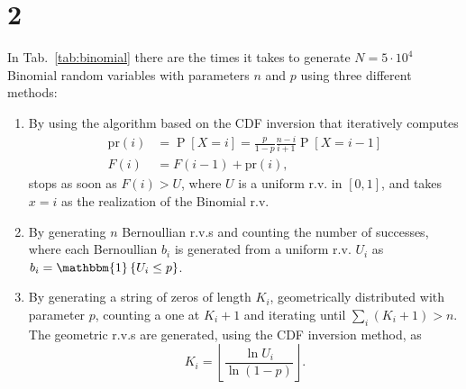\documentclass[a4paper,oneside]{article}
\newcommand{\floor}[1]{\left\lfloor#1\right\rfloor}
\newcommand{\Prob}[1]{\operatorname{P}\left[#1\right]}
\newcommand{\ind}[1]{\operatorname{\mathbbm{1}}\left\{#1\right\}}
\begin{document}
\section*{2}
In Tab.~\ref{tab:binomial} there are the times it takes to generate
$N=5\cdot10^4$ Binomial random variables with parameters $n$ and $p$
using three different methods:
\begin{enumerate}
\item By using the algorithm based on the CDF inversion that
  iteratively computes
  \begin{align*}
    \mathrm{pr}(i) &= \Prob{X = i} = \frac{p}{1-p}\frac{n-i}{i+1}\Prob{X = i-1} \\
    F(i) &= F(i-1) + \mathrm{pr}(i) ,
  \end{align*}
  stops as soon as $F(i) > U$, where $U$ is a uniform r.v. in $[0,
    1]$, and takes $x = i$ as the realization of the Binomial r.v.
  \item By generating $n$ Bernoullian r.v.s and counting the number of
    successes, where each Bernoullian $b_i$ is generated from a uniform
    r.v. $U_i$ as $b_i = \ind{U_i \leq p}$.
  \item By generating a string of zeros of length $K_i$, geometrically
    distributed with parameter $p$, counting a one at $K_i+1$ and
    iterating until $\sum_i \left( K_i + 1 \right) > n$. The geometric
    r.v.s are generated, using the CDF inversion method, as
    \[ K_i = \floor{\frac{\ln U_i}{\ln (1 - p)}} . \]
\end{enumerate}
\end{document}
